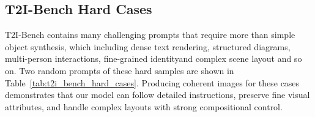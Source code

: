 \documentclass{article}
\begin{document}
\subsection{T2I-Bench Hard Cases}
T2I-Bench contains many challenging prompts that require more than simple object synthesis, which including dense text rendering, structured diagrams, multi-person interactions, fine-grained identityand complex scene layout and so on. Two random prompts of these hard samples are shown in Table~\ref{tab:t2i_bench_hard_cases}. Producing coherent images for these cases demonstrates that our model can follow detailed instructions, preserve fine visual attributes, and handle complex layouts with strong compositional control.

\begin{table}[t]
\centering
\renewcommand{\arraystretch}{1.12}
\caption{Randomly selected hard-case prompts from T2I-Bench).}
\label{tab:t2i_bench_hard_cases}
\end{table}
\end{document}
